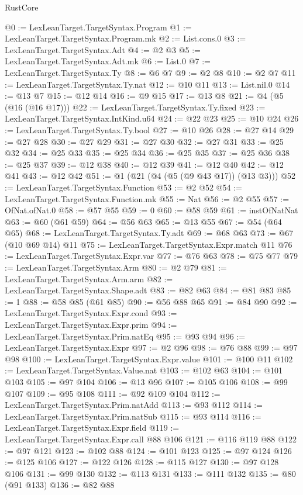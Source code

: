 \begin{lexlean}{RustCore}
\begin{coremodule}
@0 := LexLeanTarget.TargetSyntax.Program
@1 := LexLeanTarget.TargetSyntax.Program.mk
@2 := List.cons.{0}
@3 := LexLeanTarget.TargetSyntax.Adt
@4 := @2 @3
@5 := LexLeanTarget.TargetSyntax.Adt.mk
@6 := List.{0}
@7 := LexLeanTarget.TargetSyntax.Ty
@8 := @6 @7
@9 := @2 @8
@10 := @2 @7
@11 := LexLeanTarget.TargetSyntax.Ty.nat
@12 := @10 @11
@13 := List.nil.{0}
@14 := @13 @7
@15 := @12 @14
@16 := @9 @15
@17 := @13 @8
@21 := @4 (@5 (@16 (@16 @17)))
@22 := LexLeanTarget.TargetSyntax.Ty.fixed
@23 := LexLeanTarget.TargetSyntax.IntKind.u64
@24 := @22 @23
@25 := @10 @24
@26 := LexLeanTarget.TargetSyntax.Ty.bool
@27 := @10 @26
@28 := @27 @14
@29 := @27 @28
@30 := @27 @29
@31 := @27 @30
@32 := @27 @31
@33 := @25 @32
@34 := @25 @33
@35 := @25 @34
@36 := @25 @35
@37 := @25 @36
@38 := @25 @37
@39 := @12 @38
@40 := @12 @39
@41 := @12 @40
@42 := @12 @41
@43 := @12 @42
@51 := @1 (@21 (@4 (@5 (@9 @43 @17)) (@13 @3)))
@52 := LexLeanTarget.TargetSyntax.Function
@53 := @2 @52
@54 := LexLeanTarget.TargetSyntax.Function.mk
@55 := Nat
@56 := @2 @55
@57 := OfNat.ofNat.{0}
@58 := @57 @55
@59 := 0
@60 := @58 @59
@61 := instOfNatNat
@63 := @60 (@61 @59)
@64 := @56 @63
@65 := @13 @55
@67 := @54 (@64 @65)
@68 := LexLeanTarget.TargetSyntax.Ty.adt
@69 := @68 @63
@73 := @67 (@10 @69 @14) @11
@75 := LexLeanTarget.TargetSyntax.Expr.match @11
@76 := LexLeanTarget.TargetSyntax.Expr.var
@77 := @76 @63
@78 := @75 @77
@79 := LexLeanTarget.TargetSyntax.Arm
@80 := @2 @79
@81 := LexLeanTarget.TargetSyntax.Arm.arm
@82 := LexLeanTarget.TargetSyntax.Shape.adt
@83 := @82 @63
@84 := @81 @83
@85 := 1
@88 := @58 @85 (@61 @85)
@90 := @56 @88 @65
@91 := @84 @90
@92 := LexLeanTarget.TargetSyntax.Expr.cond
@93 := LexLeanTarget.TargetSyntax.Expr.prim
@94 := LexLeanTarget.TargetSyntax.Prim.natEq
@95 := @93 @94
@96 := LexLeanTarget.TargetSyntax.Expr
@97 := @2 @96
@98 := @76 @88
@99 := @97 @98
@100 := LexLeanTarget.TargetSyntax.Expr.value
@101 := @100 @11
@102 := LexLeanTarget.TargetSyntax.Value.nat
@103 := @102 @63
@104 := @101 @103
@105 := @97 @104
@106 := @13 @96
@107 := @105 @106
@108 := @99 @107
@109 := @95 @108
@111 := @92 @109 @104
@112 := LexLeanTarget.TargetSyntax.Prim.natAdd
@113 := @93 @112
@114 := LexLeanTarget.TargetSyntax.Prim.natSub
@115 := @93 @114
@116 := LexLeanTarget.TargetSyntax.Expr.field
@119 := LexLeanTarget.TargetSyntax.Expr.call @88 @106
@121 := @116 @119 @88
@122 := @97 @121
@123 := @102 @88
@124 := @101 @123
@125 := @97 @124
@126 := @125 @106
@127 := @122 @126
@128 := @115 @127
@130 := @97 @128 @106
@131 := @99 @130
@132 := @113 @131
@133 := @111 @132
@135 := @80 (@91 @133)
@136 := @82 @88

\end{coremodule}
\end{lexlean}
